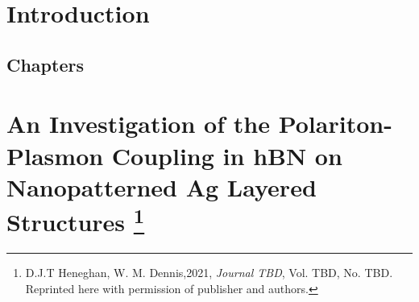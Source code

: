 \documentclass[12pt]{report}
\begin{document}
\listoftables    %
\listoffigures   %

\newpage
{}  %



\chapter{Introduction}

   
\section{Chapters}
\label{sec:chap}




% 
% 
% 
% 
\chapter[An Investigation of the Polariton-Plasmon Coupling in hBN on Nanopatterned Ag Layered Structures]
  {An Investigation of the Polariton-Plasmon Coupling in hBN on Nanopatterned Ag Layered Structures%
  \footnote{D.J.T Heneghan, W. M. Dennis,2021, 
  \emph{Journal TBD}, Vol. TBD, No. TBD. \indent\indent Reprinted here with permission of publisher and authors.}}
  \label{chapter:Ag_hBN}

  \newpage
\end{document}
